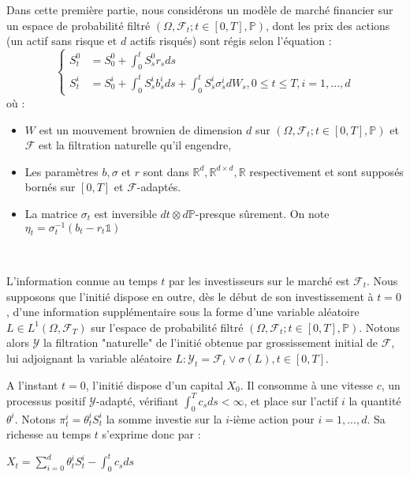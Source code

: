 \documentclass[../finalreport.tex]{subfiles}
\begin{document}
\par Dans cette première partie, nous considérons un modèle de marché financier sur un espace de probabilité filtré $(\Omega, \mathcal{F}_t; t \in [0,T], \mathbb{P})$, dont les prix des actions (un actif sans risque et $d$ actifs risqués) sont régis selon l'équation : 
\begin{equation}
\begin{cases}
S^0_t &= S_0^0 + \int_{0}^{t} S^0_s r_s ds \\
\displaystyle S_t^i &= S_0^i + \int_{0}^{t} S_s^i b_s^i ds +  \int_{0}^{t} S_s^i \sigma_s^i dW_s, 0\leq t \leq T, i = 1,...,d
\end{cases}
\end{equation}
où :

\begin{itemize}
\item $W$ est un mouvement brownien de dimension $d$ sur $(\Omega, \mathcal{F}_t; t \in [0,T], \mathbb{P})$ et $\mathcal{F}$ est la filtration naturelle qu'il engendre,
\item Les paramètres $b, \sigma$ et $r$ sont dans $\mathbb{R}^d, \mathbb{R}^{d\times d}, \mathbb{R}$ respectivement et sont supposés bornés sur $[0,T]$ et $\mathcal{F}$-adaptés.
\item La matrice $\sigma_t$ est inversible $dt \otimes d\mathbb{P}$-presque sûrement. On note $\eta_t = \sigma_t^{-1} \left( b_t - r_t \mathds{1} \right)$ 
\end{itemize}
\

\par L'information connue au temps $t$ par les investisseurs sur le marché est $\mathcal{F}_t$.
Nous supposons que l'initié dispose en outre, dès le début de son investissement à $t=0$, d'une information supplémentaire sous la forme d'une variable aléatoire $L \in L^1(\Omega, \mathcal{F}_T)$ sur l'espace de probabilité filtré $(\Omega, \mathcal{F}_t; t \in [0,T], \mathbb{P})$. 
Notons alors $\mathcal{Y}$ la filtration "naturelle" de l'initié obtenue par grossissement initial de $\mathcal{F}$, lui adjoignant la variable aléatoire $L : \mathcal{Y}_t = \mathcal{F}_t \vee \sigma(L), t \in [0, T]$.\\

\par A l'instant $t=0$, l'initié dispose d'un capital $X_0$. Il consomme à une vitesse $c$, un processus positif $\mathcal{Y}$-adapté, vérifiant $\int_{0}^{T} c_s ds < \infty$, et place sur l'actif $i$ la quantité $\theta^i$. Notons $\pi_t^i = \theta^i_t S_t^i$ la somme investie sur la $i$-ième action pour $i =1, ..., d$. Sa richesse au temps $t$ s'exprime donc par : 
\begin{center}
$X_t = \displaystyle \sum_{i=0}^{d} \theta^i_t S_t^i - \int_{0}^{t} c_s ds$
\end{center}
\end{document}
